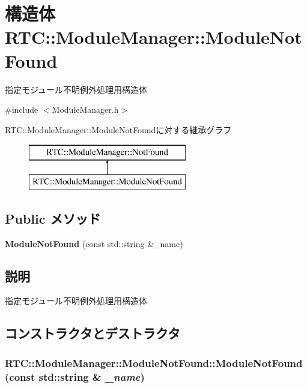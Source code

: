 \section{構造体 RTC::ModuleManager::ModuleNotFound}
\label{structRTC_1_1ModuleManager_1_1ModuleNotFound}


指定モジュール不明例外処理用構造体  




{\ttfamily \#include $<$ModuleManager.h$>$}

RTC::ModuleManager::ModuleNotFoundに対する継承グラフ\begin{figure}[H]
\begin{center}
\leavevmode
\includegraphics[height=2cm]{structRTC_1_1ModuleManager_1_1ModuleNotFound}
\end{center}
\end{figure}
\subsection*{Public メソッド}
\begin{DoxyCompactItemize}
\item 
{\bf ModuleNotFound} (const std::string \&\_\-name)
\end{DoxyCompactItemize}


\subsection{説明}
指定モジュール不明例外処理用構造体 

\subsection{コンストラクタとデストラクタ}
\subsubsection[{ModuleNotFound}]{\setlength{\rightskip}{0pt plus 5cm}RTC::ModuleManager::ModuleNotFound::ModuleNotFound (const std::string \& {\em \_\-name})\hspace{0.3cm}{\ttfamily  [inline]}}\label{structRTC_1_1ModuleManager_1_1ModuleNotFound_a24f3fd51dff9c8835d5884d1c8e205e5}
